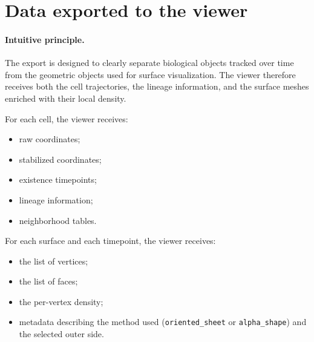 \documentclass[11pt,a4paper]{article}
\begin{document}
\section{Data exported to the viewer}

\paragraph{Intuitive principle.}
The export is designed to clearly separate biological objects tracked over time from the geometric objects used for surface visualization. The viewer therefore receives both the cell trajectories, the lineage information, and the surface meshes enriched with their local density.

For each cell, the viewer receives:
\begin{itemize}
  \item raw coordinates;
  \item stabilized coordinates;
  \item existence timepoints;
  \item lineage information;
  \item neighborhood tables.
\end{itemize}

For each surface and each timepoint, the viewer receives:
\begin{itemize}
  \item the list of vertices;
  \item the list of faces;
  \item the per-vertex density;
  \item metadata describing the method used (\texttt{oriented\_sheet} or \texttt{alpha\_shape}) and the selected outer side.
\end{itemize}
\end{document}
